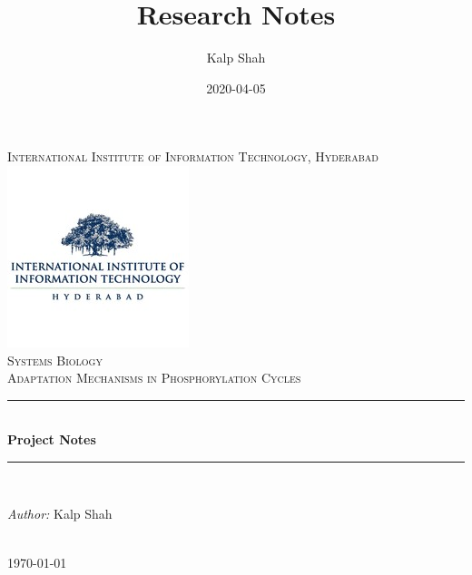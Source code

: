 \documentclass{book}
\title{Research Notes}
\date{2020-04-05}
\author{Kalp Shah}
\begin{document}


\begin{titlepage}
    \newcommand{\HRule}{\rule{\linewidth}{0.5mm}}
    \center
    \textsc{\LARGE International Institute of Information Technology, Hyderabad}\\[0.5cm]
    \includegraphics[scale=1]{img/iiit-logo.jpeg}\\[0.5cm]
    \textsc{\Large Systems Biology}\\[0.5cm]
    \textsc{\large Adaptation Mechanisms in Phosphorylation Cycles}\\[0.5cm] %
    \HRule \\[0.4cm]
    { \huge \bfseries Project Notes}\\[0.4cm]
    \HRule \\[1.5cm]
    \begin{minipage}{0.6\textwidth}
    \begin{flushleft} \large
    \emph{Author:} Kalp Shah
    \end{flushleft}
    \end{minipage}\\[2cm]
    {\large \today}\\[2cm]
    \vfill
\end{titlepage}





\end{document}

